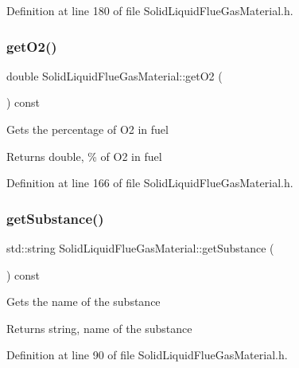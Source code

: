 Definition at line 180 of file Solid\+Liquid\+Flue\+Gas\+Material.\+h.

\mbox{\label{class_solid_liquid_flue_gas_material_a08d588e576f605d3f9925cb649e1105e}} 
\subsubsection{\texorpdfstring{get\+O2()}{getO2()}}
{\footnotesize\ttfamily double Solid\+Liquid\+Flue\+Gas\+Material\+::get\+O2 (\begin{DoxyParamCaption}{ }\end{DoxyParamCaption}) const\hspace{0.3cm}{\ttfamily [inline]}}

Gets the percentage of O2 in fuel \begin{DoxyReturn}{Returns}
double, \% of O2 in fuel 
\end{DoxyReturn}


Definition at line 166 of file Solid\+Liquid\+Flue\+Gas\+Material.\+h.

\mbox{\label{class_solid_liquid_flue_gas_material_a6e07a23fb05c15c7e5dba39334988de8}} 
\subsubsection{\texorpdfstring{get\+Substance()}{getSubstance()}}
{\footnotesize\ttfamily std\+::string Solid\+Liquid\+Flue\+Gas\+Material\+::get\+Substance (\begin{DoxyParamCaption}{ }\end{DoxyParamCaption}) const\hspace{0.3cm}{\ttfamily [inline]}}

Gets the name of the substance \begin{DoxyReturn}{Returns}
string, name of the substance 
\end{DoxyReturn}


Definition at line 90 of file Solid\+Liquid\+Flue\+Gas\+Material.\+h.

